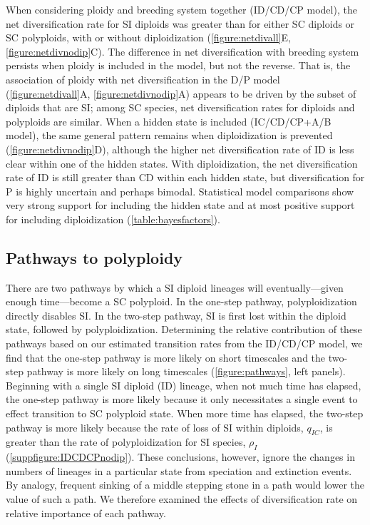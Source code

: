 When considering ploidy and breeding system together (ID/CD/CP model), the net diversification rate for SI diploids was greater than for either SC diploids or SC polyploids, with or without diploidization (\cref{figure:netdivall}E, \cref{figure:netdivnodip}C).
The difference in net diversification with breeding system persists when ploidy is included in the model, but not the reverse.
That is, the association of ploidy with net diversification in the D/P model (\cref{figure:netdivall}A, \cref{figure:netdivnodip}A) appears to be driven by the subset of diploids that are SI; among SC species, net diversification rates for diploids and polyploids are similar.
%
When a hidden state is included (IC/CD/CP+A/B model), the same general pattern remains when diploidization is prevented (\cref{figure:netdivnodip}D), although the higher net diversification rate of ID is less clear within one of the hidden states.
With diploidization, the net diversification rate of ID is still greater than CD within each hidden state, but diversification for P is highly uncertain and perhaps bimodal.
Statistical model comparisons show very strong support for including the hidden state and at most positive support for including diploidization (\cref{table:bayesfactors}).

\subsection{Pathways to polyploidy}

There are two pathways by which a SI diploid lineages will eventually---given enough time---become a SC polyploid.
In the one-step pathway, polyploidization directly disables SI.
In the two-step pathway, SI is first lost within the diploid state, followed by polyploidization.
Determining the relative contribution of these pathways based on our estimated transition rates from the ID/CD/CP model, we find that the one-step pathway is more likely on short timescales and the two-step pathway is more likely on long timescales (\cref{figure:pathways}, left panels).
Beginning with a single SI diploid (ID) lineage, when not much time has elapsed, the one-step pathway is more likely because it only necessitates a single event to effect transition to SC polyploid state.
When more time has elapsed, the two-step pathway is more likely because the rate of loss of SI within diploids, $q_{IC}$, is greater than the rate of polyploidization for SI species, $\rho_I$ (\cref{suppfigure:IDCDCPnodip}).
These conclusions, however, ignore the changes in numbers of lineages in a particular state from speciation and extinction events.
By analogy, frequent sinking of a middle stepping stone in a path would lower the value of such a path.
We therefore examined the effects of diversification rate on relative importance of each pathway.


